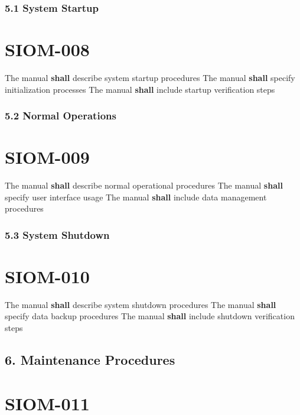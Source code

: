 \subsubsection{5.1 System Startup}

\section{SIOM-008}\label{SIOM-008}

The manual \textbf{shall} describe system startup procedures
The manual \textbf{shall} specify initialization processes
The manual \textbf{shall} include startup verification steps

\subsubsection{5.2 Normal Operations}

\section{SIOM-009}\label{SIOM-009}

The manual \textbf{shall} describe normal operational procedures
The manual \textbf{shall} specify user interface usage
The manual \textbf{shall} include data management procedures

\subsubsection{5.3 System Shutdown}

\section{SIOM-010}\label{SIOM-010}

The manual \textbf{shall} describe system shutdown procedures
The manual \textbf{shall} specify data backup procedures
The manual \textbf{shall} include shutdown verification steps

\subsection{6. Maintenance Procedures}

\section{SIOM-011}\label{SIOM-011}

